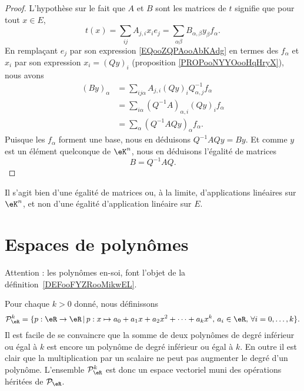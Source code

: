\begin{proof}
	L'hypothèse sur le fait que \( A\) et \( B\) sont les matrices de \( t\) signifie que pour tout \( x\in E\),
	\begin{equation}
		t(x)=\sum_{ij}A_{j,i}x_ie_j=\sum_{\alpha\beta}B_{\alpha,\beta}y_{\beta}f_{\alpha}.
	\end{equation}
	En remplaçant \( e_j\) par son expression \eqref{EQooZQPAooAbKAdg} en termes des \( f_{\alpha}\) et \( x_i\) par son expression \( x_i=(Qy)_i\) (proposition \ref{PROPooNYYOooHqHryX}), nous avons
	\begin{subequations}
		\begin{align}
			(By)_{\alpha} & =\sum_{ij\alpha}A_{j,i}(Qy)_iQ^{-1}_{\alpha, j}f_{\alpha} \\
			              & =\sum_{i \alpha}(Q^{-1}A)_{\alpha, i}(Qy)_i f_{\alpha}    \\
			              & =\sum_{\alpha}(Q^{-1} AQy)_{\alpha}f_{\alpha}.
		\end{align}
	\end{subequations}
	Puisque les \( f_{\alpha}\) forment une base, nous en déduisons \( Q^{-1}AQy=By\). Et comme \( y\) est un élément quelconque de \( \eK^n\), nous en déduisons l'égalité de matrices
	\begin{equation}    \label{ooWKTYooOJfclT}
		B=Q^{-1}AQ.
	\end{equation}
\end{proof}
Il s'agit bien d'une égalité de matrices ou, à la limite, d'applications linéaires sur \( \eK^n\), et non d'une égalité d'application linéaire sur \( E\).

\section{Espaces de polynômes}
\label{SecEspacePolynomes}

Attention : les polynômes en-soi, font l'objet de la définition~\ref{DEFooFYZRooMikwEL}.

Pour chaque \( k>0\) donné, nous définissons
\begin{equation}
	\mathcal{P}_\eR^k=\{p:\eR\to \eR\,|\, p : x\mapsto a_0+a_1 x +a_2 x^2 + \cdots+a_k x^k, \, a_i\in\eR,\,\forall i=0,\ldots,k\}.
\end{equation}
Il est facile de se convaincre que la somme de deux polynômes de degré inférieur ou égal à \( k\) est encore un polynôme de degré inférieur ou égal à \( k\). En outre il est clair que la multiplication par un scalaire ne peut pas augmenter le degré d'un polynôme. L'ensemble \( \mathcal{P}_\eR^k\) est donc un espace vectoriel muni des opérations héritées de \( \mathcal{P}_{\eR}\).

